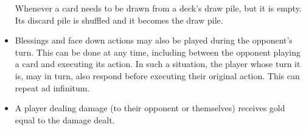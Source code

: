 \documentclass[dvipsnames,parskip,a4paper]{scrartcl}
\begin{document}
\begin{itemize}
Whenever a card needs to be drawn from a deck's draw pile, but it is empty. Its discard pile is shuffled and it becomes the draw pile.

\item

Blessings and face down actions may also be played during the opponent's turn. This can be done at any time, including between the opponent playing a card and executing its action. In such a situation, the player whose turn it is, may in turn, also respond before executing their original action. This can repeat ad infinitum.

\item

A player dealing damage (to their opponent or themselves) receives gold equal to the damage dealt.

\end{itemize}

\newpage
\end{document}
